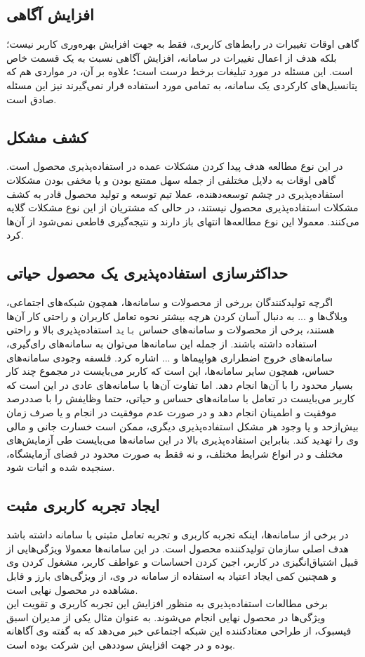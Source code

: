 \subsection{افزایش آگاهی}
گاهی اوقات تغییرات در رابط‌های کاربری، فقط به جهت افزایش بهره‌وری کاربر نیست؛ بلکه هدف از اعمال تغییرات در سامانه، افزایش آگاهی نسبت به یک قسمت خاص است. این مسئله در مورد تبلیغات برخط درست است؛ علاوه بر آن، در مواردی هم که پتانسیل‌های کارکردی یک سامانه، به تمامی مورد استفاده قرار نمی‌گیرند نیز این مسئله صادق است.
\subsection{کشف مشکل}
در این نوع مطالعه هدف پیدا کردن مشکلات عمده در استفاده‌پذیری محصول است. گاهی اوقات به دلایل مختلفی از جمله سهل ممتنع بودن و یا مخفی بودن مشکلات استفاده‌پذیری در چشم توسعه‌دهنده، عملا تیم توسعه و تولید محصول قادر به کشف مشکلات استفاده‌پذیری محصول نیستند، در حالی که مشتریان از این نوع مشکلات گلایه می‌کنند. معمولا این نوع مطالعه‌ها انتهای باز دارند و نتیجه‌گیری قاطعی نمی‌شود از آن‌ها کرد.
\subsection{حداکثرسازی استفاده‌پذیری یک محصول حیاتی}
اگرچه تولیدکنندگان بررخی از محصولات و سامانه‌ها، همچون شبکه‌های اجتماعی، وبلاگ‌ها و ... به دنبال آسان کردن هرچه بیشتر نحوه تعامل کاربران و راحتی کار آن‌ها هستند، برخی از محصولات و سامانه‌های حساس
\texttt{باید}
استفاده‌پذیری بالا و راحتی استفاده داشته باشند. از جمله این سامانه‌ها می‌توان به سامانه‌های رای‌گیری، سامانه‌های خروج اضطراری هواپیماها و ... اشاره کرد. فلسفه وجودی سامانه‌های حساس، همچون سایر سامانه‌ها، این است که کاربر می‌بایست در مجموع چند کار بسیار محدود را با آن‌ها انجام دهد. اما تفاوت آن‌ها با سامانه‌های عادی در این است که کاربر می‌بایست در تعامل با سامانه‌های حساس و حیاتی، حتما وظایفش را با صددرصد موفقیت و اطمینان انجام دهد و در صورت عدم موفقیت در انجام و یا صرف زمان بیش‌از‌حد و یا وجود هر مشکل استفاده‌پذیری دیگری، ممکن است خسارت جانی و مالی وی را تهدید کند. بنابراین استفاده‌پذیری بالا در این سامانه‌ها می‌بایست طی آزمایش‌های مختلف و در انواع شرایط مختلف، و نه فقط به صورت محدود در فضای آزمایشگاه، سنجیده شده و اثبات شود.
\subsection{ایجاد تجربه کاربری مثبت}
در برخی از سامانه‌ها، اینکه تجربه کاربری و تجربه تعامل مثبتی با سامانه داشته باشد هدف اصلی سازمان تولیدکننده محصول است. در این سامانه‌ها معمولا ویژگی‌هایی از قبیل اشتیاق‌انگیزی در کاربر، اجین کردن احساسات و عواطف کاربر، مشغول کردن وی و همچنین کمی ایجاد اعتیاد به استفاده از سامانه در وی، از ویژگی‌های بارز و قابل مشاهده در محصول نهایی است.\\
برخی مطالعات استفاده‌پذیری به منظور افزایش این تجربه کاربری و تقویت این ویژگی‌ها در محصول نهایی انجام می‌شوند. به عنوان مثال یکی از مدیران اسبق فیسبوک، از طراحی معتادکننده این شبکه اجتماعی خبر می‌دهد
\cite{noauthor_sean_nodate}
که به گفته وی آگاهانه بوده و در جهت افزایش سوددهی این شرکت بوده است.
